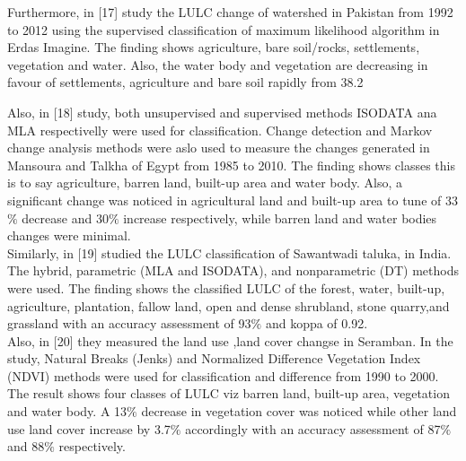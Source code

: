 \documentclass[12pt,a4paper]{article}
\begin{document}
	
	Furthermore, in [17] study the LULC change of watershed in Pakistan from 1992 to 2012 using the supervised classification of	maximum likelihood algorithm in Erdas Imagine. The finding	shows agriculture, bare soil/rocks, settlements,	vegetation and water. Also, the water body and vegetation are	decreasing in favour of settlements, agriculture and bare soil rapidly from 38.2%
	
	Also, in [18] study, both unsupervised  and supervised  methods ISODATA ana MLA respectivelly  were used for classification. Change	detection and Markov change analysis methods were aslo used to measure the changes generated  in 	Mansoura and Talkha of Egypt from 1985 to 2010. The finding shows classes this is to say agriculture, barren land, built-up	area and water body. Also, a significant change was noticed in	agricultural land and built-up area to tune of 33$\%$ decrease and	30$\%$ increase respectively, while barren land and water bodies
	changes were minimal.\\
	
	Similarly, in [19] studied the LULC classification of Sawantwadi taluka, in India. The hybrid, parametric (MLA and ISODATA),	and nonparametric (DT) methods were used. The finding shows	the classified LULC of the forest, water, built-up, agriculture, 	plantation, fallow land, open and dense shrubland, stone quarry,and grassland with an accuracy assessment of 93$\%$ and koppa of	0.92.\\
	
	Also, in [20] they  measured the land use ,land cover changse in Seramban. In the	study, Natural Breaks (Jenks) and Normalized Difference Vegetation Index (NDVI) methods were used for classification and difference from 1990 to 2000. The result shows four classes of	LULC viz barren land, built-up area, vegetation and water body. A 13$\%$ decrease in vegetation cover was noticed while other land use land cover increase by 3.7$\%$ accordingly with an accuracy	assessment of 87$\%$ and 88$\%$ respectively.\\
	

	
\end{document}
